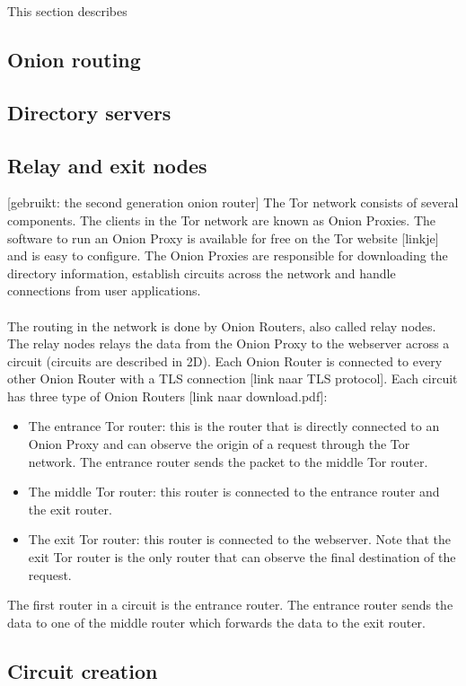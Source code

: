 \documentclass[journal]{IEEEtran}
\begin{document}
		This section describes 
		
		\subsection{Onion routing}
		
		\subsection{Directory servers}
		
		\subsection{Relay and exit nodes}

[gebruikt: the second generation onion router]
The Tor network consists of several components. The clients in the Tor network are known as Onion Proxies. The software to run an Onion Proxy is available for free on the Tor website [linkje] and is easy to configure. The Onion Proxies are responsible for downloading the directory information, establish circuits across the network and handle connections from user applications.\\\\
The routing in the network is done by Onion Routers, also called relay nodes. The relay nodes relays the data from the Onion Proxy to the webserver across a circuit (circuits are described in 2D). Each Onion Router is connected to every other Onion Router with a TLS connection [link naar TLS protocol]. Each circuit has three type of Onion Routers [link naar download.pdf]:\begin{itemize}
\item The entrance Tor router: this is the router that is directly connected to an Onion Proxy and can observe the origin of a request through the Tor network. The entrance router sends the packet to the middle Tor router.
\item The middle Tor router: this router is connected to the entrance router and the exit router.
\item The exit Tor router: this router is connected to the webserver. Note that the exit Tor router is the only router that can observe the final destination of the request.
\end{itemize}
The first router in a circuit is the entrance router. The entrance router sends the data to one of the middle router which forwards the data to the exit router.
		
		\subsection{Circuit creation}
\end{document}

